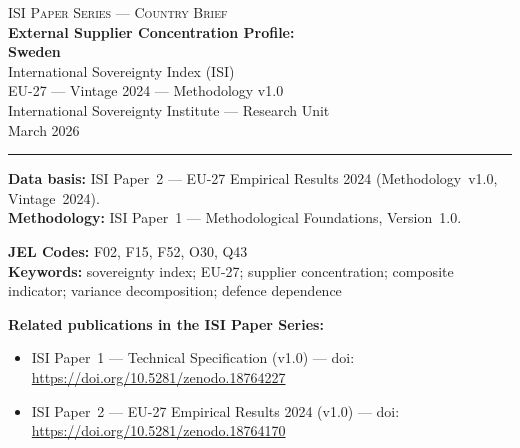 \documentclass[12pt,a4paper]{article}
\begin{document}
\hypersetup{pageanchor=false}

\begin{titlepage}
\centering
\vspace*{2cm}
{\Large\textsc{ISI Paper Series --- Country Brief}}\\[1.2cm]
{\LARGE\bfseries External Supplier Concentration Profile:\\[0.3em]
Sweden}\\[1.5cm]
{\large International Sovereignty Index (ISI)\\[0.3em]
EU-27 --- Vintage 2024 --- Methodology v1.0}\\[1.2cm]
{\large International Sovereignty Institute --- Research Unit}\\[0.8cm]
{\large March 2026}

\vspace{0.8cm}
\noindent\rule{\textwidth}{0.4pt}
\vspace{0.4cm}

\begin{flushleft}
\noindent\textbf{Data basis:} ISI Paper~2 --- EU-27 Empirical Results 2024 (Methodology~v1.0, Vintage~2024).\\[4pt]
\noindent\textbf{Methodology:} ISI Paper~1 --- Methodological Foundations, Version~1.0.

\medskip

\noindent\textbf{JEL Codes:} F02, F15, F52, O30, Q43\\[4pt]
\noindent\textbf{Keywords:} sovereignty index; EU-27; supplier concentration; composite indicator; variance decomposition; defence dependence

\medskip

\noindent\textbf{Related publications in the ISI Paper Series:}
\begin{itemize}[nosep,leftmargin=1.5em]
\item ISI Paper~1 --- Technical Specification (v1.0) --- doi:\\
  \url{https://doi.org/10.5281/zenodo.18764227}
\item ISI Paper~2 --- EU-27 Empirical Results 2024 (v1.0) --- doi:\\
  \url{https://doi.org/10.5281/zenodo.18764170}
\end{itemize}
\end{flushleft}
\vfill
\end{titlepage}
\end{document}
